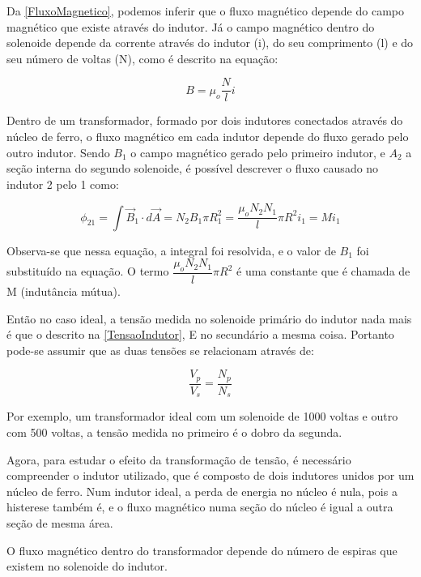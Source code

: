 \documentclass[11pt,a4paper]{article}
\begin{document}
	Da \cref{FluxoMagnetico}, podemos inferir que o fluxo magnético depende do campo magnético que existe através do indutor. Já o campo magnético dentro do solenoide depende da corrente através do indutor (i), do seu comprimento (l) e do seu número de voltas (N), como é descrito na equação:
	
	\begin{equation}
	    B = \mu _o \dfrac{N}{l} i
	    \label{CampoMag}
	\end{equation}
	
	Dentro de um transformador, formado por dois indutores conectados através do núcleo de ferro, o fluxo magnético em cada indutor depende do fluxo gerado pelo outro indutor. Sendo $B_1$ o campo magnético gerado pelo primeiro indutor, e $A_2$ a seção interna do segundo solenoide, é possível descrever o fluxo causado no indutor 2 pelo 1 como:
	
	\begin{equation}
	    \phi _{21}=\int \overrightarrow {B}_{1}\cdot d\overrightarrow {A} = N_2 B_1 \pi R_{1}^2 = \dfrac{\mu _o N_2 N_1}{l}\pi R^2 i_ 1 = Mi_1
	    \label{fluxo}
	\end{equation}
	
    Observa-se que nessa equação, a integral foi resolvida, e o valor de $B_1$ foi substituído na equação. O termo $\dfrac{\mu _o N_2 N_1}{l}\pi R^2$ é uma constante que é chamada de M (indutância mútua).
	
	Então no caso ideal, a tensão medida no solenoide primário do indutor nada mais é que o descrito na \cref{TensaoIndutor},
	E no secundário a mesma coisa. Portanto pode-se assumir que as duas tensões se relacionam através de:
	
	\begin{equation}
	    \dfrac{V_p}{V_s}=\dfrac{N_p}{N_s}
	    \label{RazaoTensao}
	\end{equation}
	
	Por exemplo, um transformador ideal com um solenoide de 1000 voltas e outro com 500 voltas, a tensão medida no primeiro é o dobro da segunda.
	
	Agora, para estudar o efeito da transformação de tensão, é necessário compreender o indutor utilizado, que é composto de dois indutores unidos por um núcleo de ferro. Num indutor ideal, a perda de energia no núcleo é nula, pois a histerese também é, e o fluxo magnético numa seção do núcleo é igual a outra seção de mesma área.
	
	O fluxo magnético dentro do transformador depende do número de espiras que existem no solenoide do indutor.
\end{document}
